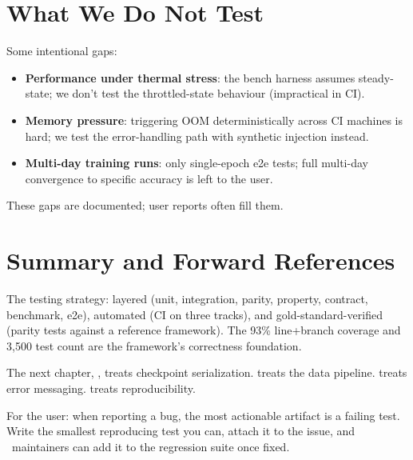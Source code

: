 \section{What We Do Not Test}
\label{sec:testing:not_tested}

Some intentional gaps:

\begin{itemize}
  \item \textbf{Performance under thermal stress}: the bench
    harness assumes steady-state; we don't test the
    throttled-state behaviour (impractical in CI).
  \item \textbf{Memory pressure}: triggering OOM
    deterministically across CI machines is hard; we test the
    error-handling path with synthetic injection instead.
  \item \textbf{Multi-day training runs}: only single-epoch
    e2e tests; full multi-day convergence to specific accuracy
    is left to the user.
\end{itemize}

These gaps are documented; user reports often fill them.

\section{Summary and Forward References}
\label{sec:testing:summary}

The testing strategy: layered (unit, integration, parity,
property, contract, benchmark, e2e), automated (CI on three
tracks), and gold-standard-verified (parity tests against a
reference framework). The 93\% line+branch coverage and 3,500
test count are the framework's correctness foundation.

The next chapter, , treats checkpoint
serialization.  treats the data
pipeline.  treats error messaging.
 treats reproducibility.

\begin{lucidnote}
For the user: when reporting a bug, the most actionable
artifact is a failing test. Write the smallest reproducing
test you can, attach it to the issue, and \Lucid\ maintainers
can add it to the regression suite once fixed.
\end{lucidnote}
